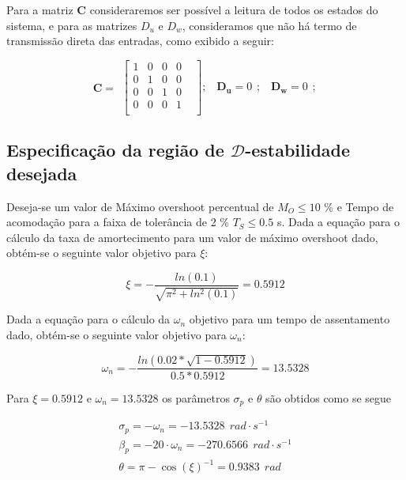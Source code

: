 Para a matriz $\mathbf{C}$ consideraremos ser possível a leitura de todos os estados do sistema, e para as matrizes $D_u$ e $D_w$, consideramos que não há termo de transmissão direta das entradas, como exibido a seguir:

\begin{equation} \label{eq:matriz_c}
    \begin{split}
        \mathbf{C}=
    \end{split}
    \begin{bmatrix}
        1&0&0&0&\\
        0&1&0&0&\\
        0&0&1&0&\\
        0&0&0&1&\\
    \end{bmatrix};\ \
    \begin{split}
        \mathbf{D_u} = 0
    \end{split};\ \
    \begin{split}
        \mathbf{D_w} = 0
    \end{split};\ \ 
\end{equation}

\subsection{Especificação da região de \( \mathcal{D}\)-estabilidade desejada}
Deseja-se um valor de Máximo overshoot percentual de $M_O \leq 10$ \% e Tempo de acomodação para a faixa de tolerância de 2 \% $T_S \leq 0.5$ s. 
Dada a equação para o cálculo da taxa de amortecimento para um valor de máximo overshoot dado, obtém-se o seguinte valor objetivo para $\xi$:

\begin{equation*}
    \xi=-\frac{ln\left(0.1\right)}{\sqrt{\pi^2+ln^2(0.1)}}=0.5912
\end{equation*}

Dada a equação para o cálculo da $\omega_n$ objetivo para um tempo de assentamento dado, obtém-se o seguinte valor objetivo para $\omega_n$:

\begin{equation*}
    \omega_n=-\frac{ln\left( 0.02*\sqrt{1-0.5912} \right)}{0.5*0.5912}=13.5328
\end{equation*}

Para $\xi=0.5912$ e $\omega_n=13.5328$ os parâmetros $\sigma_p$ e $\theta$ são obtidos como se segue

\begin{equation}\label{ed:dstab:params}
    \begin{split}
       \sigma_p=-\omega_n=-13.5328\ \ rad\cdot s^{-1}\\
       \beta_p=-20\cdot\omega_n=-270.6566\ \ rad\cdot s^{-1}\\
       \theta=\pi-\cos{(\xi)}^{-1}=0.9383\ \ rad\\    
    \end{split}
\end{equation}

